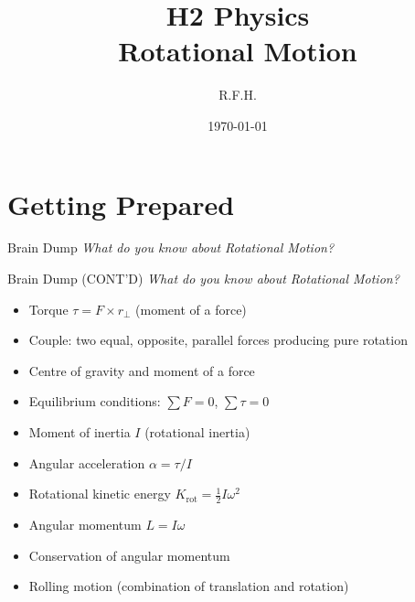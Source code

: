 \documentclass[11pt]{beamer}
\title{H2 Physics \\ Rotational Motion}
\author{R.F.H.}
\date{\today}
\begin{document}
\begin{frame}
\titlepage
\end{frame}

\section{Getting Prepared}

\begin{frame}[shrink=15]{Brain Dump}
\centering
\Large
\textit{What do you know about Rotational Motion?}
\vfill
\end{frame}

\begin{frame}[shrink=15]{Brain Dump (CONT'D)}
\centering
\Large
\textit{What do you know about Rotational Motion?}
\vfill
\begin{itemize}
    \item Torque $\tau = F \times r_{\perp}$ (moment of a force)
    \item Couple: two equal, opposite, parallel forces producing pure rotation
    \item Centre of gravity and moment of a force
    \item Equilibrium conditions: $\sum F = 0$, $\sum \tau = 0$
    \item Moment of inertia $I$ (rotational inertia)
    \item Angular acceleration $\alpha = \tau / I$
    \item Rotational kinetic energy $K_{\text{rot}} = \frac12 I \omega^2$
    \item Angular momentum $L = I \omega$
    \item Conservation of angular momentum
    \item Rolling motion (combination of translation and rotation)
\end{itemize}
\end{frame}
\end{document}
